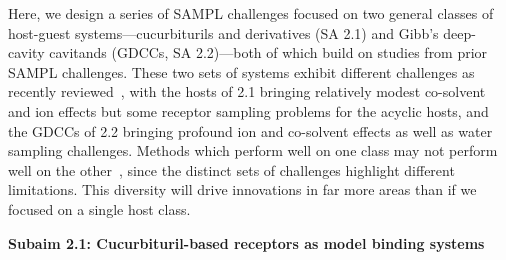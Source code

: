 \documentclass[11pt]{article}
\begin{document}
Here, we design a series of SAMPL challenges focused on two general classes of host-guest systems---cucurbiturils and derivatives (SA 2.1) and Gibb's deep-cavity cavitands (GDCCs, SA 2.2)---both of which build on studies from prior SAMPL challenges.
These two sets of systems exhibit different challenges as recently reviewed~\cite{mobley_predicting_2016}, with the hosts of 2.1 bringing relatively modest co-solvent and ion effects but some receptor sampling problems for the acyclic hosts, and the GDCCs of 2.2 bringing profound ion and co-solvent effects as well as water sampling challenges.
Methods which perform well on one class may not perform well on the other~\cite{mobley_predicting_2016}, since the distinct sets of challenges highlight different limitations.
This diversity will drive innovations in far more areas than if we focused on a single host class.



{\bf Subaim 2.1: Cucurbituril-based receptors as model binding systems}
\end{document}
